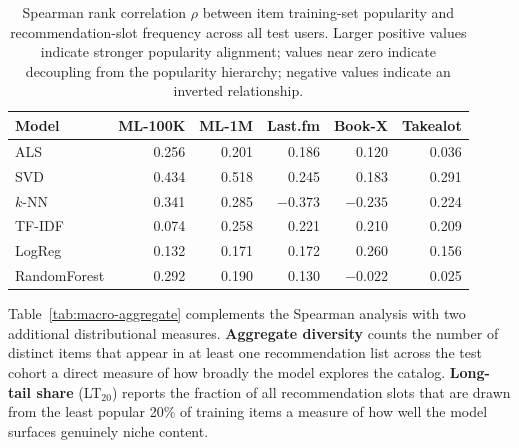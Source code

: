 \documentclass[11pt,a4paper]{report}
\begin{document}
\begin{table}[htbp]
  \centering
  \caption{Spearman rank correlation $\rho$ between item training-set popularity and recommendation-slot frequency across all test users. Larger positive values indicate stronger popularity alignment; values near zero indicate decoupling from the popularity hierarchy; negative values indicate an inverted relationship.}
  \label{tab:macro-spearman}
  \begin{tabular}{@{}l rrrrr@{}}
    \toprule
    \textbf{Model} & \textbf{ML-100K} & \textbf{ML-1M} & \textbf{Last.fm} & \textbf{Book-X} & \textbf{Takealot} \\
    \midrule
    ALS           & 0.256 & 0.201 & 0.186 & 0.120 &  0.036 \\
    SVD           & 0.434 & 0.518 & 0.245 & 0.183 &  0.291 \\
    $k$-NN        & 0.341 & 0.285 & $-0.373$ & $-0.235$ & 0.224 \\
    TF-IDF       & 0.074 & 0.258 & 0.221 & 0.210 &  0.209 \\
    LogReg        & 0.132 & 0.171 & 0.172 & 0.260 &  0.156 \\
    RandomForest  & 0.292 & 0.190 & 0.130 & $-0.022$ &  0.025 \\
    \bottomrule
  \end{tabular}
\end{table}

Table~\ref{tab:macro-aggregate} complements the Spearman analysis with two additional distributional measures. \textbf{Aggregate diversity} counts the number of distinct items that appear in at least one recommendation list across the test cohort a direct measure of how broadly the model explores the catalog. \textbf{Long-tail share} (LT$_{20}$) reports the fraction of all recommendation slots that are drawn from the least popular 20\% of training items a measure of how well the model surfaces genuinely niche content.
\end{document}

